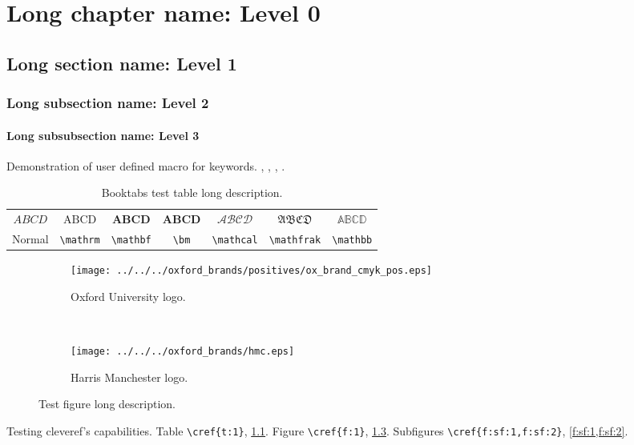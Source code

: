 \chapter[Short chapter name]{Long chapter name: Level 0}
	\section[Short section name]{Long section name: Level 1}
		\subsection[Short subsection name]{Long subsection name: Level 2}
			\subsubsection[Short subsubsection name]{Long subsubsection name: Level 3}
				Demonstration of user defined macro for keywords. , , , \cite{greenwade93}.
				
				\begin{table}[htbp!]
					\centering
					\caption[Test table short description.]{Booktabs test table long description.}
					\label{t:1}
					\begin{tabular}{ccccccc}
						\toprule
						$ ABCD $ & $ \mathrm{ABCD} $ & $ \mathbf{ABCD} $ & $ \bm{ABCD} $ & $ \mathcal{ABCD} $ & $ \mathfrak{ABCD} $ & $ \mathbb{ABCD} $\\
						\cmidrule{2-3}\morecmidrules\cmidrule{5-6}
						Normal & \verb|\mathrm| &\verb|\mathbf| & \verb|\bm| & \verb|\mathcal| & \verb|\mathfrak| & \verb|\mathbb| \\
						\bottomrule
					\end{tabular}
				\end{table}
				
				\begin{figure}[htbp!]
					\centering
					\begin{subfigure}[c]{0.45\textwidth}
						\centering
						\texttt{[image: ../../../oxford\_brands/positives/ox\_brand\_cmyk\_pos.eps]}
						\caption{Oxford University logo.}
						\label{f:sf:1}
					\end{subfigure}
					~
					\begin{subfigure}[c]{0.45\textwidth}
						\centering
						\texttt{[image: ../../../oxford\_brands/hmc.eps]}
						\caption{Harris Manchester logo.}
						\label{f:sf:2}
					\end{subfigure}
					\caption[Test figure short description.]{Test figure long description.}
					\label{f:1}
				\end{figure}
				
				Testing cleveref's capabilities. Table \verb|\cref{t:1}|, \cref{t:1}. Figure \verb|\cref{f:1}|, \cref{f:1}. Subfigures \verb|\cref{f:sf:1,f:sf:2}|, \cref{f:sf:1,f:sf:2}.
				\incarabcounter